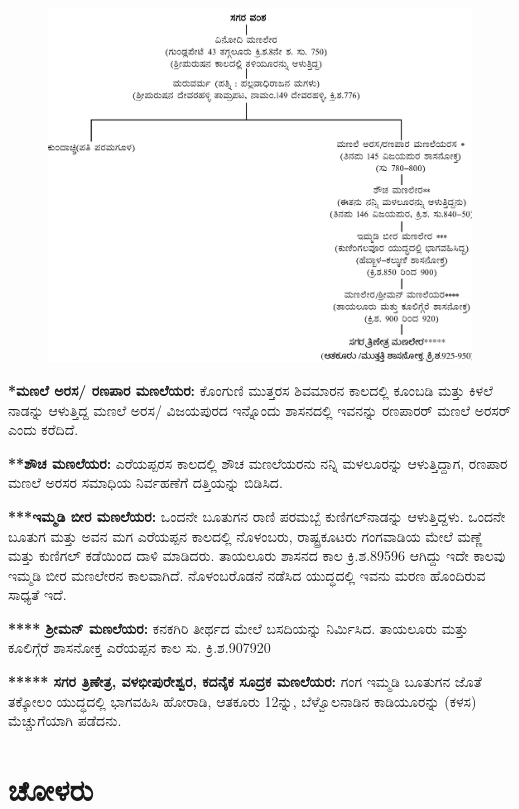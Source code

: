 \begin{figure}[H]
\includegraphics{images/chap2/1a.jpg}
\end{figure}

\textbf{*ಮಣಲೆ ಅರಸ/ ರಣಪಾರ ಮಣಲೆಯರ: } ಕೊಂಗುಣಿ ಮುತ್ತರಸ ಶಿವಮಾರನ ಕಾಲದಲ್ಲಿ ಕೂಂಬಡಿ ಮತ್ತು ಕಿಳಲೆ ನಾಡನ್ನು ಆಳುತ್ತಿದ್ದ ಮಣಲೆ ಅರಸ/ ವಿಜಯಪುರದ ಇನ್ನೊಂದು ಶಾಸನದಲ್ಲಿ ಇವನನ್ನು ರಣಪಾರರ್​ ಮಣಲೆ ಅರಸರ್​ ಎಂದು ಕರೆದಿದೆ.

\textbf{**ಶೌಚ ಮಣಲೆಯರ:} ಎರೆಯಪ್ಪರಸ ಕಾಲದಲ್ಲಿ ಶೌಚ ಮಣಲೆಯರನು ನನ್ನಿ ಮಳಲೂರನ್ನು ಆಳುತ್ತಿದ್ದಾಗ, ರಣಪಾರ ಮಣಲೆ ಅರಸರ ಸಮಾಧಿಯ ನಿರ್ವಹಣೆಗೆ ದತ್ತಿಯನ್ನು ಬಿಡಿಸಿದ.

\textbf{***ಇಮ್ಮಡಿ ಬೀರ ಮಣಲೆಯರ:} ಒಂದನೇ ಬೂತುಗನ ರಾಣಿ ಪರಮಬ್ಬೆ ಕುಣಿಗಲ್​ ನಾಡನ್ನು ಆಳುತ್ತಿದ್ದಳು. ಒಂದನೇ ಬೂತುಗ ಮತ್ತು ಅವನ ಮಗ ಎರೆಯಪ್ಪನ ಕಾಲದಲ್ಲಿ ನೊಳಂಬರು, ರಾಷ್ಟ್ರಕೂಟರು ಗಂಗವಾಡಿಯ ಮೇಲೆ ಮಣ್ಣೆ ಮತ್ತು ಕುಣಿಗಲ್​ ಕಡೆಯಿಂದ ದಾಳಿ ಮಾಡಿದರು. ತಾಯಲೂರು ಶಾಸನದ ಕಾಲ ಕ್ರಿ.ಶ.895\enginline{-}96 ಆಗಿದ್ದು ಇದೇ ಕಾಲವು ಇಮ್ಮಡಿ ಬೀರ ಮಣಲೇರನ ಕಾಲವಾಗಿದೆ. ನೊಳಂಬರೊಡನೆ ನಡೆಸಿದ ಯುದ್ಧದಲ್ಲಿ ಇವನು ಮರಣ ಹೊಂದಿರುವ ಸಾಧ್ಯತೆ ಇದೆ.

\textbf{**** ಶ‍್ರೀಮನ್​ ಮಣಲೆಯರ:} ಕನಕಗಿರಿ ತೀರ್ಥದ ಮೇಲೆ ಬಸದಿಯನ್ನು ನಿರ್ಮಿಸಿದ. ತಾಯಲೂರು ಮತ್ತು ಕೂಲಿಗ್ಗೆರೆ ಶಾಸನೋಕ್ತ ಎರೆಯಪ್ಪನ ಕಾಲ ಸು. ಕ್ರಿ.ಶ.907\enginline{-}920

\textbf{***** ಸಗರ ತ್ರಿಣೇತ್ರ, ವಳಭೀಪುರೇಶ್ವರ, ಕದನೈಕ ಸೂದ್ರಕ ಮಣಲೆಯರ:} ಗಂಗ ಇಮ್ಮಡಿ ಬೂತುಗನ ಜೊತೆ ತಕ್ಕೋಲಂ ಯುದ್ಧದಲ್ಲಿ ಭಾಗವಹಿಸಿ ಹೋರಾಡಿ, ಆತಕೂರು 12ನ್ನು, ಬೆಳ್ವೊಲನಾಡಿನ ಕಾಡಿಯೂರನ್ನು (ಕಳಸ) ಮೆಚ್ಚುಗೆಯಾಗಿ ಪಡೆದನು.


\section*{ಚೋಳರು}

